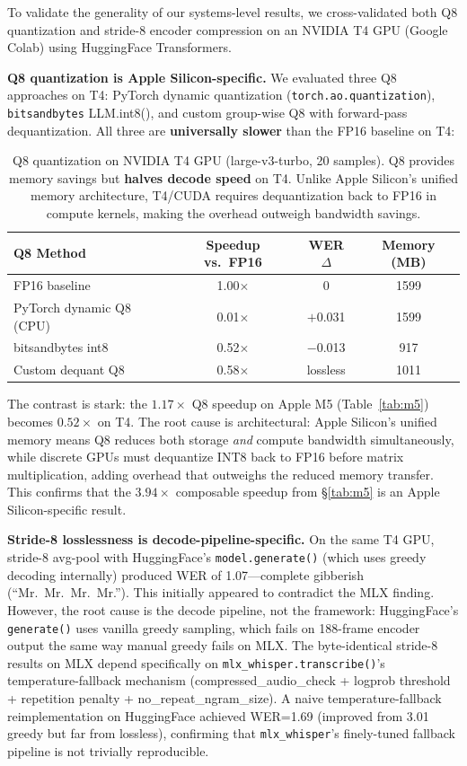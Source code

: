 \documentclass[11pt,a4paper]{article}
\begin{document}
To validate the generality of our systems-level results, we cross-validated both Q8 quantization and stride-8 encoder compression on an NVIDIA T4 GPU (Google Colab) using HuggingFace Transformers.

\noindent\textbf{Q8 quantization is Apple Silicon-specific.} We evaluated three Q8 approaches on T4: PyTorch dynamic quantization (\texttt{torch.ao.quantization}), \texttt{bitsandbytes} LLM.int8(), and custom group-wise Q8 with forward-pass dequantization. All three are \textbf{universally slower} than the FP16 baseline on T4:

\begin{table}[H]
\centering
\small
\begin{tabular}{@{}lccc@{}}
\toprule
\textbf{Q8 Method} & \textbf{Speedup vs.\ FP16} & \textbf{WER $\Delta$} & \textbf{Memory (MB)} \\
\midrule
FP16 baseline & 1.00$\times$ & 0 & 1599 \\
PyTorch dynamic Q8 (CPU) & 0.01$\times$ & $+$0.031 & 1599 \\
bitsandbytes int8 & 0.52$\times$ & $-$0.013 & 917 \\
Custom dequant Q8 & 0.58$\times$ & lossless & 1011 \\
\bottomrule
\end{tabular}
\caption{Q8 quantization on NVIDIA T4 GPU (large-v3-turbo, 20 samples). Q8 provides memory savings but \textbf{halves decode speed} on T4. Unlike Apple Silicon's unified memory architecture, T4/CUDA requires dequantization back to FP16 in compute kernels, making the overhead outweigh bandwidth savings.}
\label{tab:q8_gpu}
\end{table}

The contrast is stark: the $1.17\times$ Q8 speedup on Apple M5 (Table~\ref{tab:m5}) becomes $0.52\times$ on T4. The root cause is architectural: Apple Silicon's unified memory means Q8 reduces both storage \emph{and} compute bandwidth simultaneously, while discrete GPUs must dequantize INT8 back to FP16 before matrix multiplication, adding overhead that outweighs the reduced memory transfer. This confirms that the $3.94\times$ composable speedup from \S\ref{tab:m5} is an Apple Silicon-specific result.

\noindent\textbf{Stride-8 losslessness is decode-pipeline-specific.} On the same T4 GPU, stride-8 avg-pool with HuggingFace's \texttt{model.generate()} (which uses greedy decoding internally) produced WER of 1.07---complete gibberish (``Mr.\ Mr.\ Mr.\ Mr.''). This initially appeared to contradict the MLX finding. However, the root cause is the decode pipeline, not the framework: HuggingFace's \texttt{generate()} uses vanilla greedy sampling, which fails on 188-frame encoder output the same way manual greedy fails on MLX. The byte-identical stride-8 results on MLX depend specifically on \texttt{mlx\_whisper.transcribe()}'s temperature-fallback mechanism (compressed\_audio\_check + logprob threshold + repetition penalty + no\_repeat\_ngram\_size). A naive temperature-fallback reimplementation on HuggingFace achieved WER=1.69 (improved from 3.01 greedy but far from lossless), confirming that \texttt{mlx\_whisper}'s finely-tuned fallback pipeline is not trivially reproducible.
\end{document}
